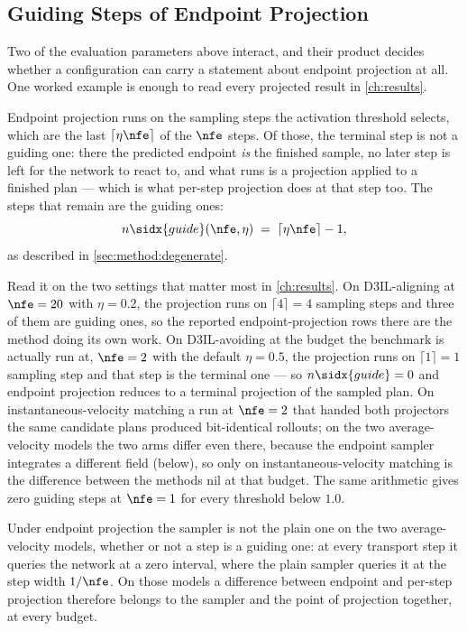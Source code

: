\subsection{Guiding Steps of Endpoint Projection}\label{sec:setup:protocol:guiding}

Two of the evaluation parameters above interact, and their product decides whether a configuration can
carry a statement about endpoint projection at all. One worked example is enough to read every projected
result in \autoref{ch:results}.

Endpoint projection runs on the sampling steps the activation threshold selects, which are the last
$\lceil \eta\nfe \rceil$ of the $\nfe$ steps. Of those, the terminal step is not a guiding one: there the
predicted endpoint \emph{is} the finished sample, no later step is left for the network to react to, and
what runs is a projection applied to a finished plan --- which is what per-step projection does at that
step too. The steps that remain are the guiding ones:
\begin{equation*}
  n\sidx{guide}(\nfe,\eta) \;=\; \lceil \eta\nfe \rceil - 1 ,
\end{equation*}
as described in \autoref{sec:method:degenerate}.

Read it on the two settings that matter most in \autoref{ch:results}. On D3IL-aligning at
$\nfe=20$ with $\eta=0.2$, the projection runs on $\lceil 4 \rceil = 4$ sampling steps and three of them
are guiding ones, so the reported endpoint-projection rows there are the method doing its own work. On
D3IL-avoiding at the budget the benchmark is actually run at, $\nfe=2$ with the default $\eta=0.5$, the
projection runs on $\lceil 1 \rceil = 1$ sampling step and that step is the terminal one --- so
$n\sidx{guide}=0$ and endpoint projection reduces to a terminal projection of the sampled plan. On
instantaneous-velocity matching a run at $\nfe=2$ that handed both projectors the same candidate plans
produced bit-identical rollouts; on the two average-velocity models the two arms differ even there, because
the endpoint sampler integrates a different field (below), so only on instantaneous-velocity matching is the
difference between the methods nil at that budget. The same arithmetic gives zero guiding steps at $\nfe=1$
for every threshold below $1.0$.

Under endpoint projection the sampler is not the plain one on the two average-velocity models, whether or
not a step is a guiding one: at every transport step it queries the network at a zero interval, where the
plain sampler queries it at the step width $1/\nfe$. On those models a difference between endpoint and
per-step projection therefore belongs to the sampler and the point of projection together, at every budget.

